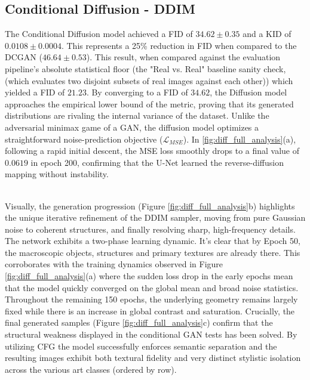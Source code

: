 \documentclass[runningheads]{llncs}
\begin{document}
\subsection{Conditional Diffusion - DDIM}
The Conditional Diffusion model achieved a FID of $34.62 \pm 0.35$ and a KID of $0.0108 \pm 0.0004$. This represents a 25\% reduction in FID when compared to the DCGAN ($46.64 \pm 0.53$). This result, when compared against the evaluation pipeline's absolute statistical floor (the "Real vs. Real" baseline sanity check, (which evaluates two disjoint subsets of real images against each other)) which yielded a FID of $21.23$. By converging to a FID of $34.62$, the Diffusion model approaches the empirical lower bound of the metric, proving that its generated distributions are rivaling the internal variance of the dataset.
Unlike the adversarial minimax game of a GAN, the diffusion model optimizes a straightforward noise-prediction objective ($\mathcal{L}_{MSE}$). In \ref{fig:diff_full_analysis}(a), following a rapid initial descent, the MSE loss smoothly drops to a final value of $0.0619$ in epoch 200, confirming that the U-Net learned the reverse-diffusion mapping without instability.

\noindent
\\
Visually, the generation progression (Figure \ref{fig:diff_full_analysis}b) highlights the unique iterative refinement of the DDIM sampler, moving from pure Gaussian noise to coherent structures, and finally resolving sharp, high-frequency details. The network exhibits a two-phase learning dynamic. It's clear that by Epoch 50, the macroscopic objects, structures and primary textures are already there. This corroborates with the training dynamics observed in Figure \ref{fig:diff_full_analysis}(a) where the sudden loss drop in the early epochs mean that the model quickly converged on the global mean and broad noise statistics. Throughout the remaining 150 epochs, the underlying geometry remains largely fixed while there is an increase in global contrast and saturation. Crucially, the final generated samples (Figure \ref{fig:diff_full_analysis}c) confirm that the structural weakness displayed in the conditional GAN tests has been solved. By utilizing CFG the model successfully enforces semantic separation and the resulting images exhibit both textural fidelity and very distinct stylistic isolation across the various art classes (ordered by row). 
\end{document}

